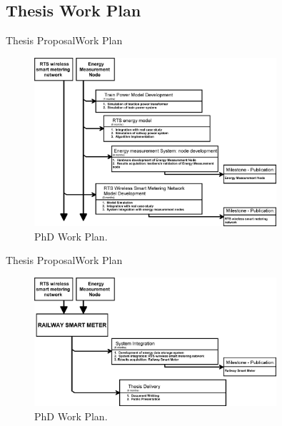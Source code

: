 \subsection{Thesis Work Plan}

\begin{frame}{Thesis Proposal}{Work Plan}

\begin{figure}[ht!]
	\centering
	\includegraphics[width=0.8\textwidth,keepaspectratio]{figures/40.Method/workplan1}
	\caption{PhD Work Plan.}
\end{figure}

\end{frame}

\begin{frame}{Thesis Proposal}{Work Plan}

\begin{figure}[ht!]
	\centering
	\includegraphics[width=0.8\textwidth,keepaspectratio]{figures/40.Method/workplan2}
	\caption{PhD Work Plan.}
\end{figure}

\end{frame}
